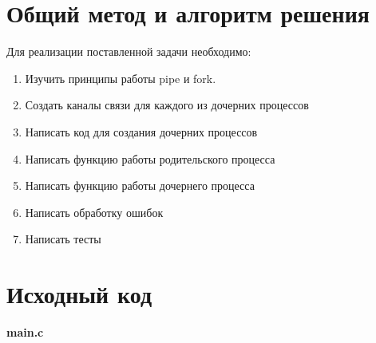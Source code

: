 \section{Общий метод и алгоритм решения}

Для реализации поставленной задачи необходимо:

\begin{enumerate}
    \item Изучить принципы работы pipe и fork.
    \item Создать каналы связи для каждого из дочерних процессов
    \item Написать код для создания дочерних процессов
    \item Написать функцию работы родительского процесса
    \item Написать функцию работы дочернего процесса
    \item Написать обработку ошибок
    \item Написать тесты
\end{enumerate}

\pagebreak

\section{Исходный код}

\textbf{main.c}

